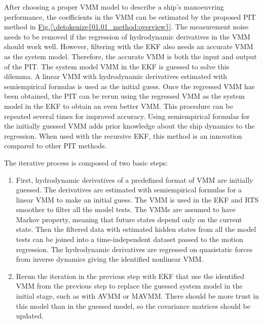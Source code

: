 \documentclass[review]{elsarticle}
\begin{document}
After choosing a proper VMM model to describe a ship’s manoeuvring performance, the coefficients in the VMM can be estimated by the proposed PIT method in \hyperref[\detokenize{01.01_method:overview}]{Fig.\@ \ref{\detokenize{01.01_method:overview}}}.
The measurement noise needs to be removed if the regression of hydrodynamic derivatives in the VMM should work well. However, filtering with the EKF also needs an accurate VMM as the system model. Therefore, the accurate VMM is both the input and output of the PIT. The system model VMM in the EKF is guessed to solve this dilemma. A linear VMM with hydrodynamic derivatives estimated with semi\sphinxhyphen{}empirical formulas is used as the initial guess. Once the regressed VMM has been obtained, the PIT can be rerun using the regressed VMM as the system model in the EKF to obtain an even better VMM. This procedure can be repeated several times for improved accuracy. Using semi\sphinxhyphen{}empirical formulas for the initially guessed VMM adds prior knowledge about the ship dynamics to the regression. When used with the recursive EKF, this method is an innovation compared to other PIT methods.

  
The iterative process is composed of two basic steps:
\begin{enumerate}
%
\item {} 
  
First, hydrodynamic derivatives of a predefined format of VMM are initially guessed. The derivatives are estimated with semi\sphinxhyphen{}empirical formulas for a linear VMM to make an initial guess. The VMM is used in the EKF and RTS smoother to filter all the model tests. The VMMs are assumed to have Markov property, meaning that future states depend only on the current state. Then the filtered data with estimated hidden states from all the model tests can be joined into a time-independent dataset passed to the motion regression. The hydrodynamic derivatives are regressed on quasi\sphinxhyphen{}static forces from inverse dynamics giving the identified nonlinear VMM.

\item {} 
  
Re\sphinxhyphen{}run the iteration in the previous step with EKF that use the identified VMM from the previous step to replace the guessed system model in the initial stage, such as with AVMM or MAVMM. There should be more trust in this model than in the guessed model, so the covariance matrices should be updated.

\end{enumerate}
\end{document}
